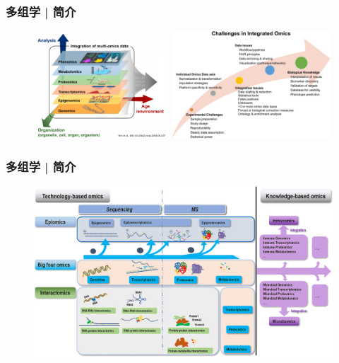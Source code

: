 \documentclass[11pt]{ctexbeamer}
\begin{document}
\begin{frame}
	\frametitle{多组学 | 简介}
	\begin{figure}
		\includegraphics[width=0.45\textwidth]{omics_02.png}
		\includegraphics[width=0.53\textwidth]{omics_04.png}
	\end{figure}
\end{frame}

\begin{frame}
	\frametitle{多组学 | 简介}
	\begin{figure}
	\includegraphics[width=\textwidth]{omics_06.png}
    \end{figure}
\end{frame}
\end{document}

